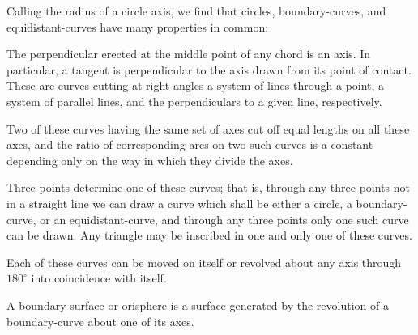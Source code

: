 Calling the radius of a circle axis, we find that circles,
boundary-curves, and equidistant-curves have many properties in
common:

The perpendicular erected at the middle point of any chord is an
axis. In particular, a tangent is perpendicular to the axis drawn
from its point of contact. These are curves cutting at right angles
a system of lines through a point, a system of parallel lines, and
the perpendiculars to a given line, respectively.

Two of these curves having the same set of axes cut off equal
lengths on all these axes, and the ratio of corresponding arcs on
two such curves is a constant depending only on the way in which
they divide the axes.

Three points determine one of these curves; that is, through any
three points not in a straight line we can draw a curve which shall
be either a circle, a boundary-curve, or an equidistant-curve, and
through any three points only one such curve can be drawn. Any
triangle may be inscribed in one and only one of these curves.

Each of these curves can be moved on itself or revolved about any
axis through $180^\circ$ into coincidence with itself.

A boundary-surface or orisphere is a surface generated by the
revolution of a boundary-curve about one of its axes.

